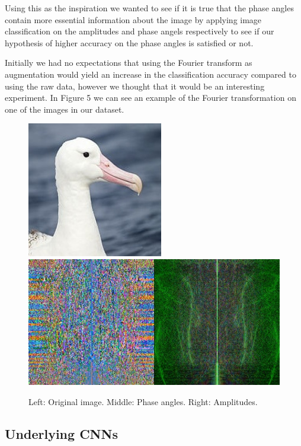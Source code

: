 \documentclass{article}
\begin{document}
Using this as the inspiration we wanted to see if it is true that the phase angles contain more essential information about the image by applying image classification on the amplitudes 
and phase angels respectively to see if our hypothesis of higher accuracy on the phase angles is satisfied or not. 

Initially we had no expectations that using the Fourier transform as augmentation would yield an increase in the classification accuracy compared to using 
the raw data, however we thought that it would be an interesting experiment. 
In Figure 5 we can see an example of the Fourier transformation on one of the images in our dataset. 

\begin{figure}[!htb]
	\raggedleft
	\includegraphics[scale=0.30]{fourier1}
	\endminipage
	\raggedleft
	\includegraphics[trim=0cm 0cm 0cm 0cm, scale=0.30]{fourier2}
	\endminipage
	\caption{Left: Original image. Middle: Phase angles. Right: Amplitudes.}
\end{figure}

\medskip

\subsection{Underlying CNNs}
\end{document}
